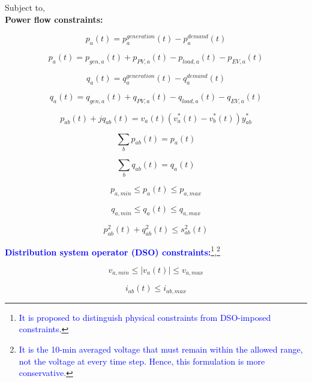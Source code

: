 Subject to, \\ 
\textbf{Power flow constraints:}

    \[p_a(t) = p^{generation}_a(t) - p^{demand}_a(t) \]
    
    \[p_a(t) =  p_{gen,a}(t)+p_{PV,a}(t)-p_{load,a}(t)-p_{EV,a}(t) \]

    
    \[q_a(t) = q^{generation}_a(t) - q^{demand}_a(t) \]
    
    \[q_a(t) =  q_{gen,a}(t)+q_{PV,a}(t)-q_{load,a}(t)-q_{EV,a}(t) \]    
    
     \begin{equation}
        p_{ab}(t) + jq_{ab}(t) = v_a(t)(v_a^\ast(t) - v_b^\ast(t))y_{ab}^\ast
    \end{equation}
   
      \begin{equation}
        \sum_{b}p_{ab}(t) = p_a(t)
    \end{equation}
    
    \begin{equation}
        \sum_{b}q_{ab}(t) = q_a(t)
    \end{equation}
    
    \begin{equation}
        p_{a,min}\leq p_{a}(t)\leq p_{a,max}
    \end{equation}
    
    \begin{equation}
        q_{a,min}\leq q_{a}(t)\leq q_{a,max}
    \end{equation}
 
     \begin{equation}
        p_{ab}^2(t) + q_{ab}^2(t) \leq s_{ab}^2(t) 
    \end{equation}
    

    
    
\textbf{\textcolor{blue}{Distribution system operator (DSO) constraints:}}\footnote{\textcolor{blue}{It is proposed to distinguish physical constraints from DSO-imposed constraints.}},\footnote{\textcolor{blue}{It is the 10-min averaged voltage that must remain within the allowed range, not the voltage at every time step. Hence, this formulation is more conservative.}}    
  
    \begin{equation}
        v_{a,min}\leq \left |v_{a}(t) \right | \leq v_{a,max} 
    \end{equation}
    
    \begin{equation}
        i_{ab}(t)\leq i_{ab,max} 
    \end{equation}  
    

